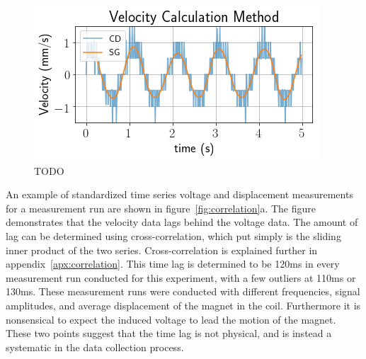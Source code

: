 \documentclass[aps,prstab,reprint,12pt]{revtex4-1}
\begin{document}
\begin{figure}[t]
    \centering
    \includegraphics[width=\linewidth]{figs/data/velocity_savgol.png}
    \caption{TODO}
    \label{fig:savgol}
\end{figure}

An example of standardized time series voltage and displacement measurements for a measurement run are shown in figure~\ref{fig:correlation}a. The figure demonstrates that the velocity data lags behind the voltage data. The amount of lag can be determined using cross-correlation, which put simply is the sliding inner product of the two series. Cross-correlation is explained further in appendix~\ref{apx:correlation}.
This time lag is determined to be 120ms in every measurement run conducted for this experiment, with a few outliers at 110ms or 130ms. These measurement runs were conducted with different frequencies, signal amplitudes, and average displacement of the magnet in the coil.
Furthermore it is nonsensical to expect the induced voltage to lead the motion of the magnet. These two points suggest that the time lag is not physical, and is instead a systematic in the data collection process.
\end{document}
